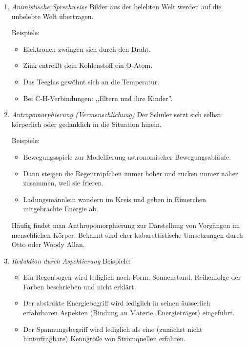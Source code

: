 \begin{enumerate}
\item { \it Animistische Sprechweise} Bilder aus der belebten
Welt werden auf die unbelebte Welt \"{u}bertragen.

\mip
Beispiele:
\begin{itemize}
\item Elektronen zw\"{a}ngen sich durch den Draht.
\item Zink entrei{\ss}t dem Kohlenstoff ein O-Atom.
\item Das Tee\-glas gew\"{o}hnt sich an die Temperatur.
\item Bei C-H-Verbindungen: ,,Eltern und ihre Kinder''.
\end{itemize}

\item { \it Antropomorphierung (Vermenschlichung)}
Der Sch\"{u}ler setzt sich selbst k\"{o}rperlich oder gedanklich in die
Situation hinein.

\mip
Beispiele:
\begin{itemize}
\item Bewegungsspiele zur Modellierung
astronomischer Bewegungsabl\"{a}ufe.
\item Dann steigen die Regentr\"{o}pfchen immer h\"{o}her und r\"{u}cken immer
n\"{a}her zusammen, weil sie frieren.
\item Ladungsm\"{a}nnlein wandern im Kreis und geben in Eimerchen
mitgebrachte Energie ab.
\end{itemize}

\mip
H\"{a}ufig findet man Anthropomorphierung zur Darstellung von
Vorg\"{a}ngen im menschlichen K\"{o}rper.
Bekannt sind eher kabarettistische Umsetzungen durch Otto
oder Woody Allan.

\item { \it Reduktion durch Aspektierung}
Beispiele:
\begin{itemize}
\item  Ein Regenbogen wird lediglich nach Form,
Sonnenstand, Reihenfolge der Farben beschrieben und nicht
erkl\"{a}rt.
\item Der abstrakte Energiebegriff wird lediglich in
seinen \"{a}usserlich erfahrbaren Aspekten (Bindung an Materie, Energietr\"{a}ger)
eingef\"{u}hrt.
\item Der Spannungsbegriff wird lediglich als eine
(zun\"{a}chst nicht hinterfragbare) Kenngr\"{o}{\ss}e von
Stromquellen erfahren.

\end{itemize}


\end{enumerate}
